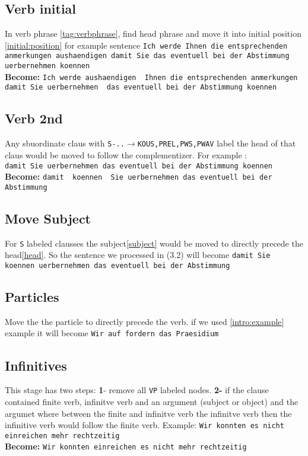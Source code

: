 \documentclass[10pt]{article}
\begin{document}
\begin{multicols*}{2}
\begin{flushleft}
\subsection{Verb initial} In verb phrase \ref{tag:verbphrase}, find head phrase and move it into initial position \ref{initial:position} for example sentence \texttt{Ich werde Ihnen die entsprechenden anmerkungen aushaendigen damit Sie das eventuell bei der Abstimmung uerbernehmen koennen}\\
\textbf{Become:} \texttt{Ich werde {\color{red}aushaendigen } Ihnen die entsprechenden anmerkungen  damit Sie {\color{red}uerbernehmen } das eventuell bei der Abstimmung koennen}
\subsection{Verb 2nd}
Any sbuordinate claus with \texttt{S-..}\(\rightarrow\)\texttt{KOUS,PREL,PWS,PWAV} label the head of that claus would be moved to follow the complementizer. For example :\\ \texttt{damit Sie uerbernehmen das eventuell bei der Abstimmung koennen}\\
\textbf{Become:} \texttt{damit {\color{red} koennen } Sie uerbernehmen das eventuell bei der Abstimmung}
\subsection{Move Subject}
For \texttt{S} labeled clausses the subject\ref{subject} would be moved to directly precede the head\ref{head}. So the sentence we processed in (3.2) will become \texttt{damit {\color{red}Sie} koennen uerbernehmen das eventuell bei der Abstimmung}
\subsection{Particles} Move the the particle to directly precede the verb. if we used \ref{intro:example} example it will become \texttt{Wir {\color{red}auf} fordern das Praesidium}
\subsection{Infinitives}
This stage has two steps: \textbf{1}- remove all \texttt{VP} labeled nodes. \textbf{2-} if the clause contained finite verb, infinitve verb and an argument (subject or object) and the argumet where between the finite and infinitve verb the infinitve verb then the infinitive verb would follow the finite verb. Example: \texttt{Wir konnten es nicht einreichen mehr rechtzeitig} \\
\textbf{Become:} \texttt{Wir konnten {\color{red}einreichen} es nicht mehr rechtzeitig}

\end{flushleft}
\end{multicols*}
\end{document}
